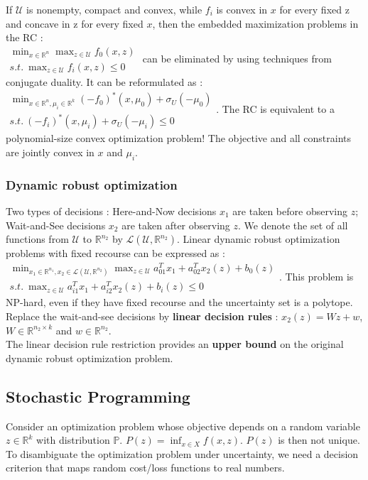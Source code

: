 \documentclass[../main.tex]{subfiles}
\begin{document}
If $\mathcal{U}$ is nonempty, compact and convex, while $f_i$ is convex in $x$ for every fixed z and concave in z for every fixed $x$, then the embedded maximization problems in the RC : \\$\begin{matrix}\min_{x\in\mathbb{R}^n} \max_{z\in\mathcal{U}} f_0(x,z)\\ s.t.\: \max_{z\in \mathcal{U}} f_i(x,z) \leq 0\end{matrix}$ can be eliminated by using techniques from conjugate duality. It can be reformulated as : $\begin{matrix}\min_{x\in \mathbb{R}^n, \mu_i \in \mathbb{R}^k} (-f_0)^*(x,\mu_0) + \sigma_U(-\mu_0) \\ s.t. \: (-f_i)^*(x,\mu_i) + \sigma_U(-\mu_i) \leq 0\end{matrix}$. The RC is equivalent to a polynomial-size convex optimization problem! The objective and all constraints are jointly convex in $x$ and $\mu_i$.\\

\subsubsection{Dynamic robust optimization}
Two types of decisions : Here-and-Now decisions $x_1$ are taken before observing $z$; Wait-and-See decisions $x_2$ are taken after observing $z$. We denote the set of all functions from $\mathcal{U}$ to $\mathbb{R}^{n_2}$ by $\mathcal{L}(\mathcal{U}, \mathbb{R}^{n_2})$. Linear dynamic robust optimization problems with fixed recourse can be expressed as :\\
$\begin{matrix}
    \min_{x_1\in\mathbb{R}^{n_1}, x_2\in \mathcal{L}(\mathcal{U}, \mathbb{R}^{n_2})} \max_{z\in\mathcal{U}} a_{01}^T x_1 + a_{02}^T x_2(z) + b_0(z)\\
    s.t. \: \max_{z\in\mathcal{U}} a_{i1}^T x_1 + a_{i2}^T x_2(z) + b_i(z)\leq 0
\end{matrix}$. This problem is NP-hard, even if they have fixed recourse and the uncertainty set is a polytope.\\
Replace the wait-and-see decisions by \textbf{linear decision rules} : $x_2(z) = Wz + w$, $W \in \mathbb{R}^{n_2\times k}$ and $w \in \mathbb{R}^{n_2}$. \\
\warning The linear decision rule restriction provides an \textbf{upper bound} on the original dynamic robust optimization problem. 

\subsection{Stochastic Programming}
Consider an optimization problem whose objective depends on a random variable $z\in \mathbb{R}^k$ with distribution $\mathbb{P}$. $P(z) = \inf_{x\in X} f(x,z)$. $P(z)$ is then not unique. To disambiguate the optimization problem under uncertainty, we need a decision criterion that maps random cost/loss functions to real numbers. \\
\end{document}
